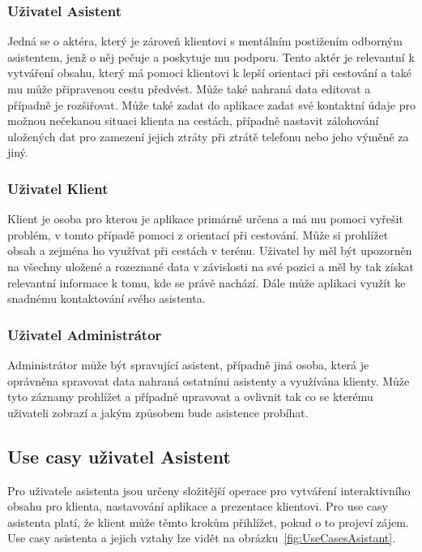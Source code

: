 \documentclass[czech,master,public,dept460,male,java,cpdeclaration]{diploma}
\begin{document}
\subsubsection{Uživatel Asistent}
Jedná se o aktéra, který je zároveň klientovi s mentálním postižením odborným asistentem,
jenž o něj pečuje a poskytuje mu podporu. Tento aktér je relevantní k vytváření obsahu,
který má pomoci klientovi k lepší orientaci při cestování a také mu může připravenou
cestu předvést. Může také nahraná data editovat a případně je rozšiřovat. Může také zadat
do aplikace zadat své kontaktní údaje pro možnou nečekanou situaci klienta na cestách, případně
nastavit zálohování uložených dat pro zamezení jejich ztráty při ztrátě telefonu nebo jeho výměně
za jiný.

\subsubsection{Uživatel Klient}
Klient je osoba pro kterou je aplikace primárně určena a má mu pomoci vyřešit problém,
v tomto případě pomoci z orientací při cestování. Může si prohlížet obsah a zejména ho
využívat při cestách v terénu. Uživatel by měl být upozorněn na všechny uložené a rozeznané
data v závislosti na své pozici a měl by tak získat relevantní informace k tomu, kde se právě
nachází. Dále může aplikaci využít ke snadnému kontaktování svého asistenta.


\subsubsection{Uživatel Administrátor}
Administrátor může být spravující asistent, případně jiná osoba, která je oprávněna spravovat
data nahraná ostatními asistenty a využívána klienty. Může tyto záznamy prohlížet a případně
 upravovat a ovlivnit tak co se kterému uživateli zobrazí a jakým způsobem bude asistence probíhat.


\subsection{Use casy uživatel Asistent}
Pro uživatele asistenta jsou určeny složitější operace pro vytváření interaktivního obsahu pro klienta,
nastavování aplikace a prezentace klientovi. Pro use casy asistenta platí, že klient může těmto
krokům přihlížet, pokud o to projeví zájem. Use casy asistenta a jejich vztahy lze vidět na obrázku~\ref{fig:UseCasesAsistant}.
\end{document}
